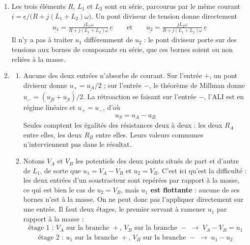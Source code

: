 \newpage

\begin{correction}

\begin{enumerate}

	\item Les trois éléments $R$, $L_1$ et $L_2$ sont en série, parcourus par le même courant $\underline{i}=\underline{e}/\big(R+j(L_1+L_2)\omega\big)$. Un pont diviseur de tension donne directement
	\begin{align*}
		\boxed{\underline{u_1}=\frac{jL_1\omega}{R+j(L_1+L_2)\omega}\,\underline{e}
		\qquad\text{et}\qquad
		\underline{u_2}=\frac{jL_2\omega}{R+j(L_1+L_2)\omega}\,\underline{e}}
	\end{align*}
	Il n'y a pas à traiter $u_1$ différemment de $u_2$ : le pont diviseur porte sur des tensions aux bornes de composants en série, que ces bornes soient ou non reliées à la masse.

	\item
	\begin{enumerate}

		\item Aucune des deux entrées n'absorbe de courant. Sur l'entrée $+$, un pont diviseur donne $\underline{u_+}=\underline{u_A}/2$ ; sur l'entrée $-$, le théorème de Millman donne $\underline{u_-}=(\underline{u_B}+\underline{u_S})/2$. La rétroaction se faisant sur l'entrée $-$, l'ALI est en régime linéaire et $u_+=u_-$, d'où
		\begin{align*}
			\boxed{u_S=u_A-u_B}
		\end{align*}
		Seules comptent les égalités des résistances deux à deux : les deux $R_A$ entre elles, les deux $R_B$ entre elles. Leurs valeurs communes n'interviennent pas dans le résultat.

		\item Notons $V_A$ et $V_B$ les potentiels des deux points situés de part et d'autre de $L_1$, de sorte que $u_1=V_A-V_B$ et $u_2=V_B$. C'est ici qu'est la difficulté : les deux entrées d'un soustracteur sont repérées par rapport à la masse, ce qui est bien le cas de $u_2=V_B$, mais \textbf{$u_1$ est flottante} : aucune de ses bornes n'est à la masse. On ne peut donc pas l'appliquer directement sur une entrée. Il faut deux étages, le premier servant à ramener $u_1$ par rapport à la masse :
		\begin{align*}
			\text{étage 1 : } V_A \text{ sur la branche } + \text{, } V_B \text{ sur la branche } - \;\longrightarrow\; V_A-V_B=u_1
		\end{align*}
		\begin{align*}
			\text{étage 2 : } u_1 \text{ sur la branche } + \text{, } V_B \text{ sur la branche } - \;\longrightarrow\; u_1-u_2
		\end{align*}


\end{enumerate}
\end{enumerate}
\end{correction}
